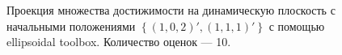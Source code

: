 \documentclass[10pt, a4paper]{article}
\begin{document}
\begin{figure}[H]
\caption{Проекция множества достижимости на динамическую плоскость с начальными положениями $\left\{(1,0,2)',(1,1,1)'\right\}$ с помощью ellipsoidal toolbox. Количество оценок --- 10.}
\end{figure}
\end{document}

